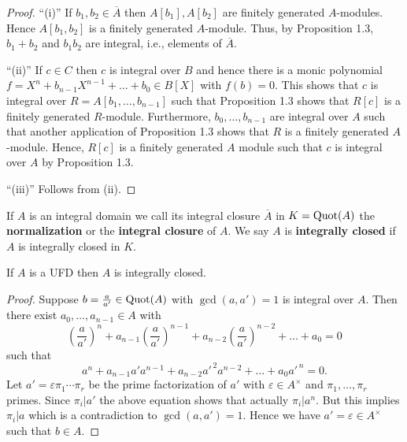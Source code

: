 \begin{proof}[Proof]
\enquote{(i)} If $b_1, b_2 \in \overline{A}$ then $A[b_1], A[b_2]$ are finitely generated $A$-modules. Hence $A[b_1,b_2]$ is a finitely generated $A$-module.
Thus, by Proposition 1.3, $b_1+b_2$ and $b_1b_2$ are integral, i.e., elements of $\overline{A}$.

\bigskip \enquote{(ii)} If $c\in C$ then $c$ is integral over $B$ and hence there is a monic polynomial $f= X^n + b_{n-1}X^{n-1} + \dots + b_0 \in B[X]$ with $f(b)=0$. This shows that $c$ is integral over $R=A[b_1,\dots,b_{n-1}]$ such that Proposition 1.3 shows that $R[c]$ is a finitely generated $R$-module.
Furthermore, $b_0,\dots, b_{n-1}$ are integral over $A$ such that another application of Proposition 1.3 shows that $R$ is a finitely generated $A$-module.
Hence, $R[c]$ is a finitely generated $A$ module such that $c$ is integral over $A$ by Proposition 1.3.

\bigskip \enquote{(iii)} Follows from (ii).
\end{proof}

\begin{defi}
If $A$ is an integral domain we call its integral closure $\overline{A}$ in $K = \operatorname{Quot}(A)$ the \textbf{normalization} or the \textbf{integral closure} of $A$. We say $A$ is \textbf{integrally closed} if $A$ is integrally closed in $K$.
\end{defi}


\begin{Bem}
	If $A$ is a UFD then $A$ is integrally closed.
\end{Bem}

\begin{proof}
Suppose $b = \frac{a}{a'} \in \operatorname{Quot}(A)$ with $\gcd(a,a') =1$ is integral over $A$.
Then there exist $a_0, \dots, a_{n-1} \in A$ with
\[ \left( \frac{a}{a'} \right)^n + a_{n-1} \left(\frac{a}{a'} \right)^{n-1}
+ a_{n-2} \left(\frac{a}{a'} \right)^{n-2} + \dots + a_0 = 0
\]
such that
\[ a^n+a_{n-1}a'a^{n-1} + a_{n-2}a'^{\, 2} a^{n-2} + \dots + a_0 a'^{\, n} = 0.
\]
Let $a' = \varepsilon \pi_1 \cdots \pi_r$ be the prime factorization of $a'$ with $\varepsilon \in A^\times$ and $\pi_1, \dots, \pi_r$ primes.
Since $\pi_i | a'$ the above equation shows that actually $\pi_i | a^n$. But this implies $\pi_i | a$ which is a contradiction to $\gcd(a,a') = 1$.
Hence we have $a' = \varepsilon \in A^\times$ such that $b \in A$.
\end{proof}



